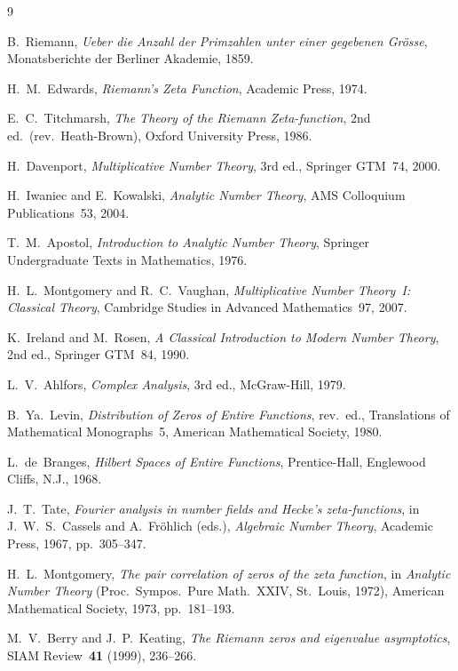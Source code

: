 \documentclass[11pt]{article}
\begin{document}
\begin{thebibliography}{9}

 B.~Riemann,
\emph{Ueber die Anzahl der Primzahlen unter einer gegebenen Gr\"osse},
Monatsberichte der Berliner Akademie, 1859.

 H.~M.~Edwards,
\emph{Riemann's Zeta Function}, Academic Press, 1974.

 E.~C.~Titchmarsh,
\emph{The Theory of the Riemann Zeta-function}, 2nd ed.\ (rev.\ Heath-Brown),
Oxford University Press, 1986.

 H.~Davenport,
\emph{Multiplicative Number Theory}, 3rd ed., Springer GTM~74, 2000.

 H.~Iwaniec and E.~Kowalski,
\emph{Analytic Number Theory}, AMS Colloquium Publications~53, 2004.

 T.~M.~Apostol,
\emph{Introduction to Analytic Number Theory}, Springer Undergraduate Texts in Mathematics, 1976.

 H.~L.~Montgomery and R.~C.~Vaughan,
\emph{Multiplicative Number Theory~I: Classical Theory},
Cambridge Studies in Advanced Mathematics~97, 2007.

 K.~Ireland and M.~Rosen,
\emph{A Classical Introduction to Modern Number Theory}, 2nd ed., Springer GTM~84, 1990.

 L.~V.~Ahlfors,
\emph{Complex Analysis}, 3rd ed., McGraw-Hill, 1979.

 B.~Ya.~Levin,
\emph{Distribution of Zeros of Entire Functions}, rev.\ ed., Translations of Mathematical
Monographs~5, American Mathematical Society, 1980.

 L.~de~Branges,
\emph{Hilbert Spaces of Entire Functions}, Prentice-Hall, Englewood Cliffs, N.J., 1968.

 J.~T.~Tate,
\emph{Fourier analysis in number fields and Hecke's zeta-functions}, in
J.~W.~S.~Cassels and A.~Fr\"ohlich (eds.), \emph{Algebraic Number Theory},
Academic Press, 1967, pp.~305--347.

 H.~L.~Montgomery,
\emph{The pair correlation of zeros of the zeta function}, in \emph{Analytic Number Theory}
(Proc.\ Sympos.\ Pure Math.~XXIV, St.~Louis, 1972), American Mathematical Society, 1973,
pp.~181--193.

 M.~V.~Berry and J.~P.~Keating,
\emph{The Riemann zeros and eigenvalue asymptotics}, SIAM Review~\textbf{41} (1999), 236--266.


\end{thebibliography}
\end{document}
